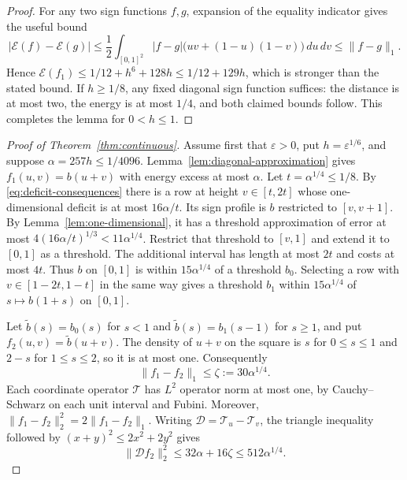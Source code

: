 \begin{proof}
For any two sign functions $f,g$, expansion of the equality indicator
gives the useful bound
\begin{equation}
 |\mathcal E(f)-\mathcal E(g)|
 \le\frac12\int_{[0,1]^2}|f-g|
       \bigl(uv+(1-u)(1-v)\bigr)\,du\,dv
 \le\|f-g\|_1.
 \label{eq:energy-lipschitz}
\end{equation}
Hence $\mathcal E(f_1)\le1/12+h^6+128h\le1/12+129h$, which is stronger
than the stated bound.  If $h\ge1/8$, any fixed diagonal sign function
suffices: the distance is at most two, the energy is at most $1/4$, and
both claimed bounds follow.  This completes the lemma for $0<h\le1$.
\end{proof}

\begin{proof}[Proof of Theorem~\ref{thm:continuous}]
Assume first that $\varepsilon>0$, put $h=\varepsilon^{1/6}$, and suppose
$\alpha=257h\le1/4096$.  Lemma~\ref{lem:diagonal-approximation} gives
$f_1(u,v)=b(u+v)$ with energy excess at most $\alpha$.
Let $t=\alpha^{1/4}\le1/8$.
By \eqref{eq:deficit-consequences} there is a row at height
$v\in[t,2t]$ whose one-dimensional deficit is at most $16\alpha/t$.
Its sign profile is $b$ restricted to $[v,v+1]$.  By
Lemma~\ref{lem:one-dimensional}, it has a threshold approximation of
error at most $4(16\alpha/t)^{1/3}<11\alpha^{1/4}$.
Restrict that threshold to $[v,1]$ and extend it to $[0,1]$ as a threshold.
The additional interval has length at most $2t$ and costs at most $4t$.
Thus $b$ on $[0,1]$ is within $15\alpha^{1/4}$ of a threshold $b_0$.
Selecting a row with $v\in[1-2t,1-t]$ in the same way gives a threshold
$b_1$ within $15\alpha^{1/4}$ of $s\mapsto b(1+s)$ on $[0,1]$.

Let $\widetilde b(s)=b_0(s)$ for $s<1$ and
$\widetilde b(s)=b_1(s-1)$ for $s\ge1$, and put
$f_2(u,v)=\widetilde b(u+v)$.  The density of $u+v$ on the square is
$s$ for $0\le s\le1$ and $2-s$ for $1\le s\le2$, so it is at most one.
Consequently
\begin{equation}
 \|f_1-f_2\|_1\le\zeta:=30\alpha^{1/4}.
 \label{eq:two-half-error}
\end{equation}
Each coordinate operator $\mathcal T$ has $L^2$ operator norm at most
one, by Cauchy--Schwarz on each unit interval and Fubini.  Moreover,
$\|f_1-f_2\|_2^2=2\|f_1-f_2\|_1$.  Writing
$\mathcal D=\mathcal T_u-\mathcal T_v$, the triangle inequality followed
by $(x+y)^2\le2x^2+2y^2$ gives
\begin{equation}
 \|\mathcal D f_2\|_2^2
 \le32\alpha+16\zeta\le512\alpha^{1/4}.
 \label{eq:two-half-operator}
\end{equation}


\end{proof}
